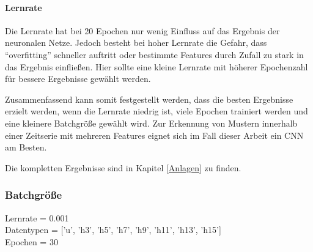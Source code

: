     \paragraph{Lernrate}
    Die Lernrate hat bei 20 Epochen nur wenig Einfluss auf das Ergebnis der neuronalen Netze.
    Jedoch besteht bei hoher Lernrate die Gefahr, dass "`overfitting"' schneller auftritt oder bestimmte Features durch Zufall zu stark in das Ergebnis einfließen.
    Hier sollte eine kleine Lernrate mit höherer Epochenzahl für bessere Ergebnisse gewählt werden.
    \newline

    \noindent
    Zusammenfassend kann somit festgestellt werden, dass die besten Ergebnisse erzielt werden, wenn die Lernrate niedrig ist, viele Epochen trainiert werden und eine kleinere Batchgröße gewählt wird.
    Zur Erkennung von Mustern innerhalb einer Zeitserie mit mehreren Features eignet sich im Fall dieser Arbeit ein \ac{CNN} am Besten.
    \newline

    Die kompletten Ergebnisse sind in Kapitel \ref{Anlagen} zu finden.

    \subsubsection{Batchgröße}

        Lernrate = 0.001\\
        \noindent
        Datentypen = ['u', 'h3', 'h5', 'h7', 'h9', 'h11', 'h13', 'h15']\\
        \noindent
        Epochen = 30\\

